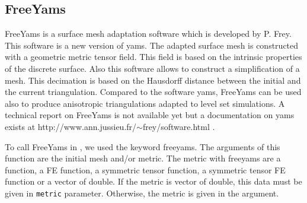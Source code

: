 \documentclass[a4paper,twoside,12pt]{book}
\begin{document}
\subsection{FreeYams}
\label{sec:freeyams}
FreeYams is a surface mesh adaptation software which is developed by P. Frey. This software is a new version of yams. The adapted surface mesh is constructed with a geometric metric tensor field. This  field is based on the intrinsic properties of the discrete surface. Also this software allows to construct a simplification of a mesh. This decimation is  based on the Hausdorff distance between the initial and the current triangulation. Compared to the software yams, FreeYams  can be used also to produce anisotropic triangulations adapted to level set simulations. A technical report on FreeYams is not available yet but a documentation on yams exists at  http://www.ann.jussieu.fr/$\sim$frey/software.html \cite{tech.freeyams}.

To call FreeYams in \freefempp, we used the keyword freeyams. The arguments of this function are the initial mesh and/or metric. The metric with freeyams are a function, a FE function, a symmetric tensor function, a symmetric tensor FE function or a vector of double. If the metric is vector of double, this data must be given in \texttt{metric} parameter. Otherwise, the metric is given in the argument.
\end{document}
